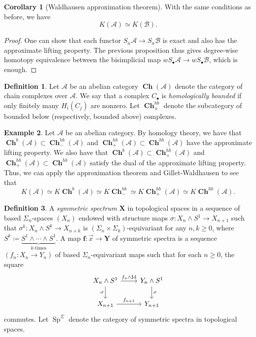 \documentclass[10pt,letterpaper,cm]{nupset}
\theoremstyle{definition}
\newtheorem{definition}{Definition}
\newtheorem{exmp}[definition]{Example}
\theoremstyle{theorem}
\newtheorem{corollary}[theorem]{Corollary}
\theoremstyle{remark}
\newcommand{\X}{\mathbf X}
\newcommand{\1}{\mathbf{1}}
\renewcommand{\a}{\mathscr{A}}
\renewcommand{\b}{\mathscr{B}}
\newcommand{\x}{\vec x}
\newcommand{\0}{\vec 0}
\DeclareMathOperator{\id}{Id}
\DeclareMathOperator{\Sp}{Sp}
\DeclareMathOperator{\ch}{\mathbf{Ch}}
\begin{document}
\begin{corollary}[Waldhausen approximation theorem]
With the same conditions as before, we have $$K(\a) \simeq K(\b).$$
\end{corollary}
\begin{proof}
One can show that each functor $S_n \a \to S_n \b$ is exact and also has the approximate lifting property.  The previous proposition thus gives degree-wise homotopy equivalence between the bisimplicial map $wS_{\bullet}\a \to wS_{\bullet} \b$, which is enough. 
\end{proof}

\begin{definition}
Let $\a$ be an abelian category $\ch(\a)$ denote the category of chain complexes over $\a$. We say that a complex $C_{\bullet}$ is \textit{homologically bounded} if only finitely many $H_i(C_j)$ are nonzero. Let $\ch_{\pm}^{hb}$ denote the subcategory of bounded below (respectively, bounded above) complexes. 
\end{definition}

\begin{exmp}
Let $\a$ be an abelian category. By homology theory, we have that $\ch^b(\a) \subset \ch_{-}^{hb}(\a)$ and $\ch_+^{hb}(\a)\subset \ch^{hb}(\a)$ have the approximate lifting property. We also have that $\ch^b(\a) \subset \ch_+^{hb}(\a)$ and $\ch_+^{hb}(\a)\subset \ch^{hb}(\a)$ satisfy the dual of the approximate lifting property. Thus, we can apply the approximation theorem and Gillet-Waldhausen to see that $$  K(\a) \simeq K\ch^b(\a) \simeq  K\ch_{-}^{hb}\simeq K\ch_{+}^{hb}(\a) \simeq K \ch^{hb}(\a).$$
\end{exmp}

\begin{definition}
 A \textit{symmetric spectrum} $\X$ in topological spaces in a sequence of based $\Sigma_n$-spaces $(X_n)$ endowed with structure maps $\sigma : X_n \land S^1 \to X_{n+1}$ such that $\sigma^k : X_n \land S^k \to X_{n+k}$ is $(\Sigma_{n}\times \Sigma_{k})$-equivariant for any $n,k\geq 0$, where $S^k \coloneqq \underbrace{S^1 \land \cdots \land S^1}_{k\text{-times}}$. A map $\mathbf{f} : \x \to \mathbf{Y}$ of symmetric spectra is a sequence $(f_n : X_n \to Y_n)$ of based $\Sigma_n$-equivariant maps such that for each $n\geq 0$, the square
\[
\begin{tikzcd}
X_n \land S^1 \arrow[d, "\sigma"'] \arrow[r, "f_n \land \id"] & Y_n \land S^1 \arrow[d, "\sigma"] \\
X_{n+1} \arrow[r, "f_{n+1}"] & Y_{n+1}
\end{tikzcd}
\]
commutes. Let $\Sp^{\Sigma}$ denote the category of symmetric spectra in topological spaces.
\end{definition}
\end{document}
